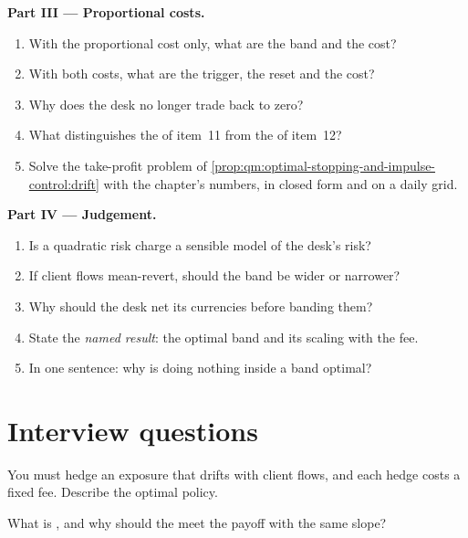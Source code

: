 \begin{problem}
\medskip\noindent\textbf{Part III --- Proportional costs.}
\begin{enumerate}[resume]
\item With the proportional cost only, what are the band and the cost?
\item With both costs, what are the trigger, the reset and the cost?
\item Why does the desk no longer trade back to zero?
\item What distinguishes the  of item~11 from the  of item~12?
\item Solve the take-profit problem of \cref{prop:qm:optimal-stopping-and-impulse-control:drift} with the chapter's numbers, in closed form and on a daily grid.
\end{enumerate}

\medskip\noindent\textbf{Part IV --- Judgement.}
\begin{enumerate}[resume]
\item Is a quadratic risk charge a sensible model of the desk's risk?
\item If client flows mean-revert, should the band be wider or narrower?
\item Why should the desk net its currencies before banding them?
\item State the \emph{named result}: the optimal band and its scaling with the fee.
\item In one sentence: why is doing nothing inside a band optimal?
\end{enumerate}
\end{problem}

\section{Interview questions}

\begin{interviewq}\label{iq:qm:optimal-stopping-and-impulse-control:1}
You must hedge an exposure that drifts with client flows, and each hedge costs a fixed fee. Describe the optimal policy.
\end{interviewq}

\begin{interviewq}\label{iq:qm:optimal-stopping-and-impulse-control:2}
What is , and why should the  meet the payoff with the same slope?
\end{interviewq}

